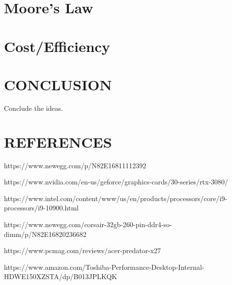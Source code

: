 \documentclass[letterpaper, 10 pt, conference]{IEEEconf}
\begin{document}
\section{Moore's Law}



\section{Cost/Efficiency}



\section{CONCLUSION}

Conclude the ideas.

\section*{REFERENCES}


\begin{enumerate}[label={[\arabic*]}]
\item https://www.newegg.com/p/N82E16811112392
\item https://www.nvidia.com/en-us/geforce/graphics-cards/30-series/rtx-3080/
\item https://www.intel.com/content/www/us/en/products/processors/core/i9-processors/i9-10900.html
\item https://www.newegg.com/corsair-32gb-260-pin-ddr4-so-dimm/p/N82E16820236682
\item https://www.pcmag.com/reviews/acer-predator-x27
\item https://www.amazon.com/Toshiba-Performance-Desktop-Internal-HDWE150XZSTA/dp/B013JPLKQK
\end{enumerate}
\end{document}
